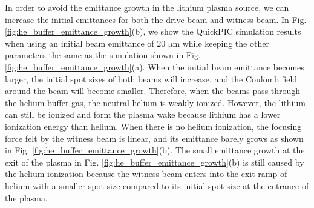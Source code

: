 \documentclass[%
reprint, superscriptaddress,
 amsmath,amssymb, aps,
prstab,
]{revtex4-2}
\begin{document}
In order to avoid the emittance growth in the lithium plasma source, we
can increase the initial emittances for both the drive beam and witness beam.
In Fig. \ref{fig:he_buffer_emittance_growth}(b), we show the QuickPIC
simulation results when using an initial beam emittance of 20 $\mathrm{\mu m}$
 while keeping the other parameters the same as the
simulation shown in Fig. \ref{fig:he_buffer_emittance_growth}(a). When
the initial beam emittance becomes larger, the initial spot sizes of
both beams will increase, and the Coulomb field around the beam will
become smaller. Therefore, when the beams pass through the helium buffer gas,
the neutral helium is weakly ionized. However, the lithium can still
be ionized and form the plasma wake because lithium has a lower
ionization energy than helium. When there is no helium ionization, the
focusing force felt by the witness beam is linear, and its
emittance barely grows as shown in
Fig. \ref{fig:he_buffer_emittance_growth}(b). The small emittance growth at the exit of the plasma in
Fig. \ref{fig:he_buffer_emittance_growth}(b) is still caused by the
helium ionization because the witness beam enters into the exit ramp of
helium with a smaller spot size compared to its initial spot size
at the entrance of the plasma.
\end{document}
